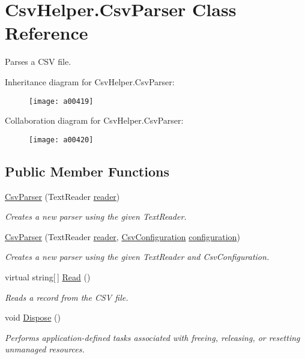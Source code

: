 \hypertarget{a00062}{\section{Csv\-Helper.\-Csv\-Parser Class Reference}
\label{a00062}
}


Parses a C\-S\-V file.  




Inheritance diagram for Csv\-Helper.\-Csv\-Parser\-:
\nopagebreak
\begin{figure}[H]
\begin{center}
\leavevmode
\texttt{[image: a00419]}
\end{center}
\end{figure}


Collaboration diagram for Csv\-Helper.\-Csv\-Parser\-:
\nopagebreak
\begin{figure}[H]
\begin{center}
\leavevmode
\texttt{[image: a00420]}
\end{center}
\end{figure}
\subsection*{Public Member Functions}
\begin{DoxyCompactItemize}
\item 
\hyperlink{a00062_a28afb6761bc195a6f20c284c46811b76}{Csv\-Parser} (Text\-Reader \hyperlink{a00062_a6ab23daf45e84a211b4010c213504f7e}{reader})
\begin{DoxyCompactList}\small\item\em Creates a new parser using the given Text\-Reader. \end{DoxyCompactList}\item 
\hyperlink{a00062_a94820d35d587215da53e0a5f2bf229d0}{Csv\-Parser} (Text\-Reader \hyperlink{a00062_a6ab23daf45e84a211b4010c213504f7e}{reader}, \hyperlink{a00057}{Csv\-Configuration} \hyperlink{a00062_aeb171813d1526839ccd41d60ab6483b2}{configuration})
\begin{DoxyCompactList}\small\item\em Creates a new parser using the given Text\-Reader and Csv\-Configuration. \end{DoxyCompactList}\item 
virtual string\mbox{[}$\,$\mbox{]} \hyperlink{a00062_a8e938842c6267343128babd111df9710}{Read} ()
\begin{DoxyCompactList}\small\item\em Reads a record from the C\-S\-V file. \end{DoxyCompactList}\item 
void \hyperlink{a00062_aa13f93a198206179cd19cdc12332d842}{Dispose} ()
\begin{DoxyCompactList}\small\item\em Performs application-\/defined tasks associated with freeing, releasing, or resetting unmanaged resources. \end{DoxyCompactList}\end{DoxyCompactItemize}
